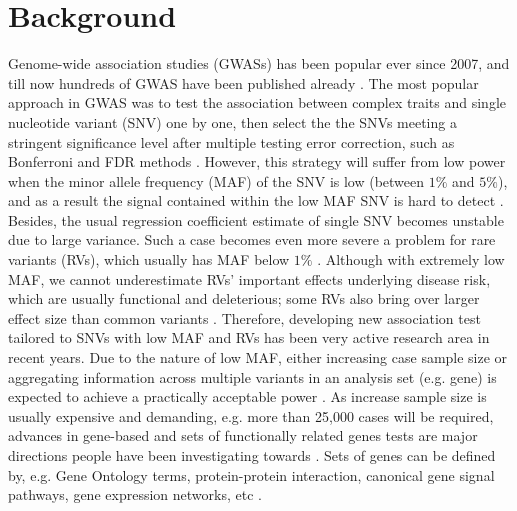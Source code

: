 \documentclass[12pt]{article}
\begin{document}
\section{Background}\label{sec:background}
\doublespacing
Genome-wide association studies (GWASs) has been popular ever since 2007, and till now hundreds of GWAS have been published already \cite{McCarthy2008}. The most popular approach in GWAS was to test the association between complex traits and single nucleotide variant (SNV) one by one, then select the the SNVs meeting a stringent significance level after multiple testing error correction, such as Bonferroni and FDR methods \cite{McCarthy2008,Hirschhorn2005}. However, this strategy will suffer from low power when the minor allele frequency (MAF) of the SNV is low (between $1\%$ and $5\%$), and as a result the signal contained within the low MAF SNV is hard to detect \cite{Sham2014}. Besides, the usual regression coefficient estimate of single SNV becomes unstable due to large variance\cite{Sham2014}. Such a case becomes even more severe a problem for rare variants (RVs), which usually has MAF below $1\%$ \cite{Bansal2010}. Although with extremely low MAF, we cannot underestimate RVs' important effects underlying disease risk, which are usually functional and deleterious; some RVs also bring over larger effect size than common variants \cite{Fu2013,Bansal2010,Sham2014,McCarthy2008}. Therefore, developing new association test tailored to SNVs with low MAF and RVs has been very active research area in recent years. Due to the nature of low MAF, either increasing case sample size or aggregating information across multiple variants in an analysis set (e.g. gene) is expected to achieve a practically acceptable power \cite{Capanu2011,Basu2011,Bansal2010,Sham2014}. As increase sample size is usually expensive and demanding, e.g. more than 25,000 cases will be required, advances in gene-based and sets of functionally related genes tests are major directions people have been investigating towards \cite{Ye2011,Pinto2010,Sham2014}. Sets of genes can be defined by, e.g. Gene Ontology terms, protein-protein interaction, canonical gene signal pathways, gene expression networks, etc \cite{Sham2014,DelaCruz2010,Weng2011,Wang2010}.
\end{document}
